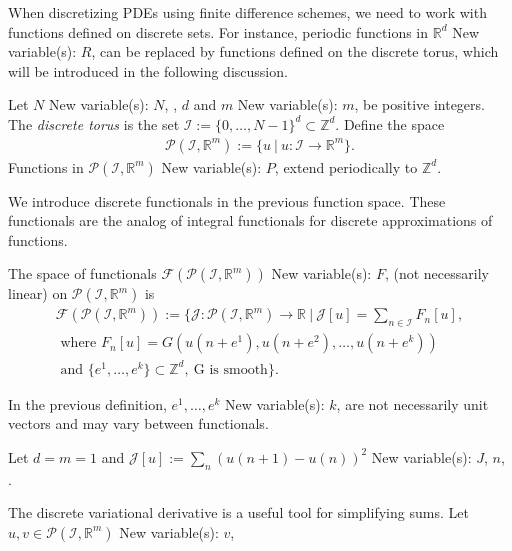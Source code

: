 \documentclass[runningheads]{llncs}
\newcommand{\1}{\chi}
\begin{document}
When discretizing PDEs using finite difference schemes, we need to work with functions defined on discrete sets. For instance, periodic functions in \(\mathbb{R}^d\)
{\color{blue} New variable(s): \(R\),  }
 can be replaced by functions defined on the discrete torus, which will be introduced in the following discussion.
\begin{definition}
	\label{d1}
	Let \(N\)
{\color{blue} New variable(s): \(N\),  }
, \(d\) and \(m\)
{\color{blue} New variable(s): \(m\),  }
 be positive integers. The \emph{discrete torus} is the set \(\mathcal{I}:=\{0,\ldots,N-1\}^d\subset {\mathbb{Z}}^d\). Define the space
	\begin{gather*}
		\mathcal{P}(\mathcal{I},\mathbb{R}^m):=\{u\ |\ u:\mathcal{I}\rightarrow\mathbb{R}^m\}.
	\end{gather*}
Functions in \(\mathcal{P}(\mathcal{I},\mathbb{R}^m)\)
{\color{blue} New variable(s): \(P\),  }
 extend periodically to \({\mathbb{Z}}^d\).
\end{definition}
We introduce discrete functionals in the previous function space. These functionals are the analog of integral functionals for discrete approximations of functions.
\begin{definition}
	\label{d2}
	The space of functionals \(\mathcal{F}(\mathcal{P}(\mathcal{I},\mathbb{R}^m))\)
{\color{blue} New variable(s): \(F\),  }
 (not necessarily linear) on \(\mathcal{P}(\mathcal{I},\mathbb{R}^m)\) is
	\begin{gather*}
		\mathcal{F}(\mathcal{P}(\mathcal{I},\mathbb{R}^m)):= \Bigg\{\mathcal{J}:\mathcal{P}(\mathcal{I},\mathbb{R}^m)\to \mathbb{R}\ \Bigg|\ \mathcal{J}[u]=\sum_{n\in\mathcal{I}}F_n[u],\\
		\text{ where }
		F_n[u]=G(u(n+e^1),u(n+e^2),\ldots,u(n+e^k))\\
		\text{ and }\{e^1,\ldots,e^k\}\subset{\mathbb{Z}}^d,\ \text{G is smooth}
		\Bigg\}.
	\end{gather*}
\end{definition}
In the previous definition, \(e^1,\ldots,e^k\)
{\color{blue} New variable(s): \(k\),  }
 are not necessarily unit vectors and may vary between functionals.
\begin{example}
	\label{functional1}
	Let \(d=m=1\) and
	\(	\mathcal{J}[u]:=\sum_{n}(u(n+1)-u(n))^2\)
{\color{blue} New variable(s): \(J\), \(n\),  }
.
\end{example}
The discrete variational derivative is a useful tool for simplifying sums.
Let \(u,v\in\mathcal{P}(\mathcal{I},\mathbb{R}^m)\)
{\color{blue} New variable(s): \(v\),  }
\end{document}
